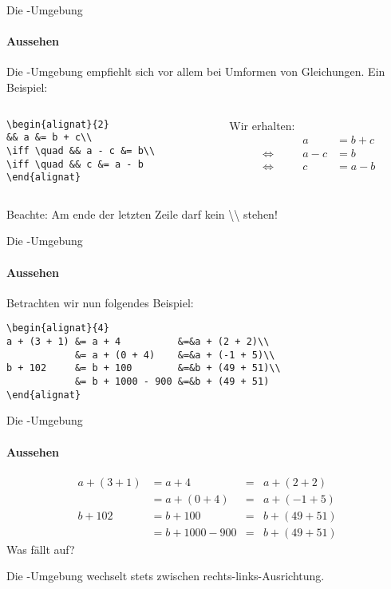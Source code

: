 \begin{frame}[fragile]{Die -Umgebung}
\framesubtitle{Aussehen} 
Die -Umgebung empfiehlt sich vor allem bei Umformen von Gleichungen. Ein Beispiel:
\begin{columns}
\begin{column}{.5\textwidth}
\begin{codeblock}
\begin{verbatim}
\begin{alignat}{2}
&& a &= b + c\\
\iff \quad && a - c &= b\\
\iff \quad && c &= a - b
\end{alignat}
\end{verbatim}
\end{codeblock}
\end{column}

\begin{column}{.4\textwidth}
Wir erhalten:
\begin{alignat}{2}
&& a &= b + c\\
\iff \quad && a - c &= b\\
\iff \quad && c &= a - b
\end{alignat}
\end{column}
\end{columns}
\pause
Beachte: \alert{Am ende der letzten Zeile darf kein \textbackslash\textbackslash{} stehen!}
\end{frame}

\begin{frame}[fragile]{Die -Umgebung}
\framesubtitle{Aussehen}
Betrachten wir nun folgendes Beispiel: 

\begin{codeblock}
\begin{verbatim}
\begin{alignat}{4}
a + (3 + 1) &= a + 4          &=&a + (2 + 2)\\
            &= a + (0 + 4)    &=&a + (-1 + 5)\\
b + 102     &= b + 100        &=&b + (49 + 51)\\
            &= b + 1000 - 900 &=&b + (49 + 51)
\end{alignat}
\end{verbatim}
\end{codeblock}
\end{frame}

\begin{frame}{Die -Umgebung}
\framesubtitle{Aussehen}
\begin{alignat}{4}
a + (3 + 1) &= a + 4          &=&a + (2 + 2)\\
            &= a + (0 + 4)    &=&a + (-1 + 5)\\
b + 102     &= b + 100        &=&b + (49 + 51)\\
            &= b + 1000 - 900 &=&b + (49 + 51)
\end{alignat}
Was fällt auf?

\medskip
\pause
Die -Umgebung wechselt stets zwischen rechts-links-Ausrichtung.
\end{frame}
